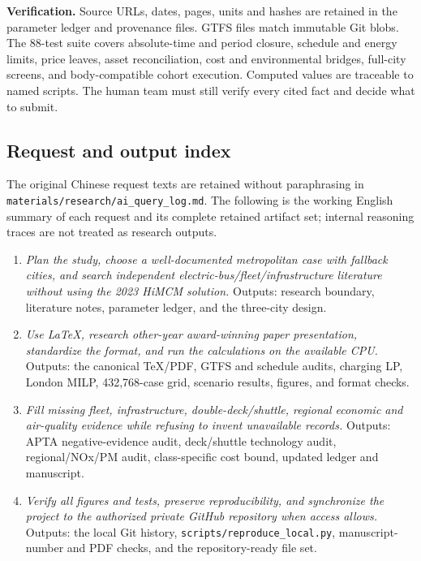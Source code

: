 \documentclass[12pt,letterpaper]{article}
\begin{document}
\textbf{Verification.} Source URLs, dates, pages, units and hashes are retained in the parameter ledger and provenance files. GTFS files match immutable Git blobs. The 88-test suite covers absolute-time and period closure, schedule and energy limits, price leaves, asset reconciliation, cost and environmental bridges, full-city screens, and body-compatible cohort execution. Computed values are traceable to named scripts. The human team must still verify every cited fact and decide what to submit.

\subsection*{Request and output index}
The original Chinese request texts are retained without paraphrasing in \nolinkurl{materials/research/ai_query_log.md}. The following is the working English summary of each request and its complete retained artifact set; internal reasoning traces are not treated as research outputs.

\begin{enumerate}[leftmargin=*]
\item \emph{Plan the study, choose a well-documented metropolitan case with fallback cities, and search independent electric-bus/fleet/infrastructure literature without using the 2023 HiMCM solution.} Outputs: research boundary, literature notes, parameter ledger, and the three-city design.
\item \emph{Use LaTeX, research other-year award-winning paper presentation, standardize the format, and run the calculations on the available CPU.} Outputs: the canonical TeX/PDF, GTFS and schedule audits, charging LP, London MILP, 432,768-case grid, scenario results, figures, and format checks.
\item \emph{Fill missing fleet, infrastructure, double-deck/shuttle, regional economic and air-quality evidence while refusing to invent unavailable records.} Outputs: APTA negative-evidence audit, deck/shuttle technology audit, regional/NOx/PM audit, class-specific cost bound, updated ledger and manuscript.
\item \emph{Verify all figures and tests, preserve reproducibility, and synchronize the project to the authorized private GitHub repository when access allows.} Outputs: the local Git history, \nolinkurl{scripts/reproduce_local.py}, manuscript-number and PDF checks, and the repository-ready file set.
\end{enumerate}
\end{document}
